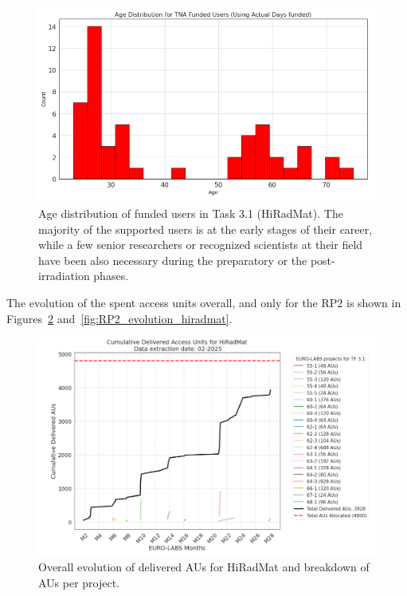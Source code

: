 \begin{figure}[!h]
    \centering
    \includegraphics[width=0.75\linewidth]{graphics/age_distr_hiradmat.png}
    \caption{Age distribution of funded users in Task 3.1 (HiRadMat). The majority of the supported users is at the early stages of their career, while a few senior researchers or recognized scientists at their field have been also necessary during the preparatory or the post-irradiation phases.}
    \label{fig:age_distr_hiradmat}
\end{figure}

The evolution of the spent access units overall, and only for the RP2 is shown in Figures~\ref{fig:overall_evolution_hiradmat} and~\ref{fig:RP2_evolution_hiradmat}.

\begin{figure}[!h]
    \centering
    \includegraphics[width=0.9\linewidth]{graphics/overall_evolution_hiradmat.png}
    \caption{Overall evolution of delivered AUs for HiRadMat and breakdown of AUs per project.}
    \label{fig:overall_evolution_hiradmat}
\end{figure}

